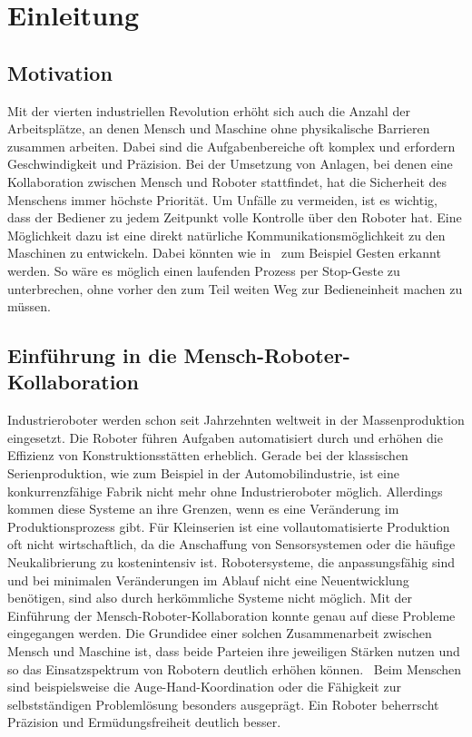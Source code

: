 \chapter{Einleitung}

\section{Motivation}
Mit der vierten industriellen Revolution erhöht sich auch die Anzahl der Arbeitsplätze, an denen Mensch und Maschine ohne physikalische Barrieren zusammen arbeiten. Dabei sind die Aufgabenbereiche oft komplex und erfordern Geschwindigkeit und Präzision. Bei der Umsetzung von Anlagen, bei denen eine Kollaboration zwischen Mensch und Roboter stattfindet, hat die Sicherheit des Menschens immer höchste Priorität. Um Unfälle zu vermeiden, ist es wichtig, dass der Bediener zu jedem Zeitpunkt volle Kontrolle über den Roboter hat. Eine Möglichkeit dazu ist eine direkt natürliche Kommunikationsmöglichkeit zu den Maschinen zu entwickeln. Dabei könnten wie in~\cite{flexibleSystem} zum Beispiel Gesten erkannt werden. So wäre es möglich einen laufenden Prozess per Stop-Geste zu unterbrechen, ohne vorher den zum Teil weiten Weg zur Bedieneinheit machen zu müssen.   

\section{Einführung in die Mensch-Roboter-Kollaboration}
Industrieroboter werden schon seit Jahrzehnten weltweit in der Massenproduktion eingesetzt. Die Roboter führen Aufgaben automatisiert durch und erhöhen die Effizienz von Konstruktionsstätten erheblich. Gerade bei der klassischen Serienproduktion, wie zum Beispiel in der Automobilindustrie, ist eine konkurrenzfähige Fabrik nicht mehr ohne Industrieroboter möglich. Allerdings kommen diese Systeme an ihre Grenzen, wenn es eine Veränderung im Produktionsprozess gibt. Für Kleinserien ist eine vollautomatisierte Produktion oft nicht wirtschaftlich, da die Anschaffung von Sensorsystemen oder die häufige Neukalibrierung zu kostenintensiv ist. Robotersysteme, die anpassungsfähig sind und bei minimalen Veränderungen im Ablauf nicht eine Neuentwicklung benötigen, sind also durch herkömmliche Systeme nicht möglich. Mit der Einführung der Mensch-Roboter-Kollaboration konnte genau auf diese Probleme eingegangen werden. Die Grundidee einer solchen Zusammenarbeit zwischen Mensch und Maschine ist, dass beide Parteien ihre jeweiligen Stärken nutzen und so das Einsatzspektrum von Robotern deutlich erhöhen können.~\cite{ObererTreitz.2019} Beim Menschen sind beispielsweise die Auge-Hand-Koordination oder die Fähigkeit zur selbstständigen Problemlösung besonders ausgeprägt. Ein Roboter beherrscht Präzision und Ermüdungsfreiheit deutlich besser.~\cite{fraunhoferMRK}

